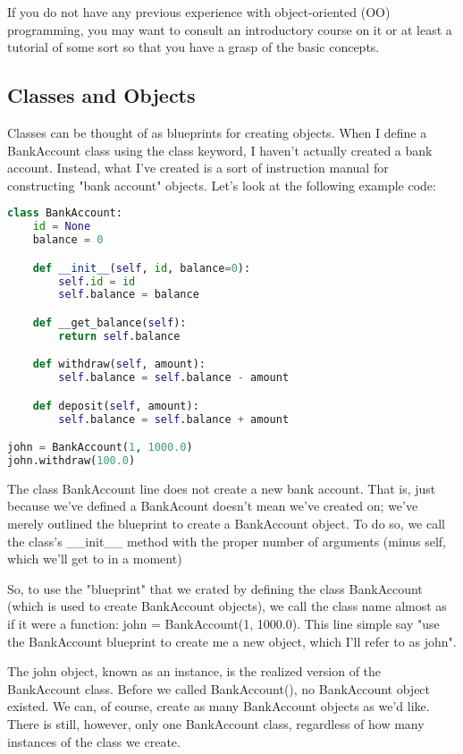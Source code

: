 If you do not have any previous experience with object-oriented (OO) programming, you may want to consult an introductory course on it or at least a tutorial of some sort so that you have a grasp of the basic concepts.

\subsection{Classes and Objects}

Classes can be thought of as blueprints for creating objects. When I define a BankAccount class using the class keyword, I haven't actually created a bank account. Instead, what I've created is a sort of instruction manual for constructing "bank account" objects. Let's look at the following example code:

\begin{lstlisting}[language=Python]
class BankAccount:
    id = None
    balance = 0

    def __init__(self, id, balance=0):
        self.id = id
        self.balance = balance

    def __get_balance(self):
        return self.balance

    def withdraw(self, amount):
        self.balance = self.balance - amount

    def deposit(self, amount):
        self.balance = self.balance + amount

john = BankAccount(1, 1000.0)
john.withdraw(100.0)
\end{lstlisting}

The class BankAccount line does not create a new bank account. That is, just because we've defined a BankAcount doesn't mean we've created on; we've merely outlined the blueprint to create a BankAccount object. To do so, we call the class's __init__ method with the proper number of arguments (minus self, which we'll get to in a moment)

So, to use the "blueprint" that we crated by defining the class BankAccount (which is used to create BankAccount objects), we call the class name almost as if it were a function: john = BankAccount(1, 1000.0). This line simple say "use the BankAccount blueprint to create me a new object, which I'll refer to as john".

The john object, known as an instance, is the realized version of the BankAccount class. Before we called BankAccount(), no BankAccount object existed. We can, of course, create as many BankAccount objects as we'd like. There is still, however, only one BankAccount class, regardless of how many instances of the class we create.

